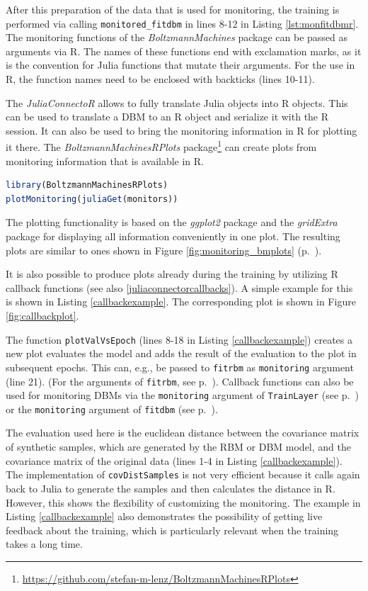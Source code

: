 \documentclass[12pt]{article}
\newcommand{\inlinecode}[1]{\texttt{#1}}
\newcommand{\apkg}[1]{\emph{#1}}
\begin{document}
After this preparation of the data that is used for monitoring, the training is performed via calling \inlinecode{monitored\_fitdbm} in lines 8-12 in Listing \ref{lst:monfitdbmr}.
The monitoring functions of the \apkg{BoltzmannMachines} package can be passed as arguments via R.
The names of these functions end with exclamation marks, as it is the convention for Julia functions that mutate their arguments.
For the use in R, the function names need to be enclosed with backticks (lines 10-11).

The \apkg{JuliaConnectoR} allows to fully translate Julia objects into R objects.
This can be used to translate a DBM to an R object and serialize it with the R session.
It can also be used to bring the monitoring information in R for plotting it there.
The \apkg{BoltzmannMachinesRPlots} package\footnote{\url{https://github.com/stefan-m-lenz/BoltzmannMachinesRPlots}} can create plots from monitoring information that is available in R.

\begin{lstlisting}[language=R, float = !h]
library(BoltzmannMachinesRPlots)
plotMonitoring(juliaGet(monitors))
\end{lstlisting}

The plotting functionality is based on the \apkg{ggplot2} package \citep{ggplot2}  and the \apkg{gridExtra} package \citep{gridExtra} for displaying all information conveniently in one plot.
The resulting plots are similar to ones shown in Figure \ref{fig:monitoring_bmplots} (p.~\pageref{fig:monitoring_bmplots}).

It is also possible to produce plots already during the training by utilizing R callback functions (see also \ref{juliaconnectorcallbacks}).
A simple example for this is shown in Listing \ref{callbackexample}.
The corresponding plot is shown in Figure \ref{fig:callbackplot}.

The function \inlinecode{plotValVsEpoch} (lines 8-18 in Listing \ref{callbackexample}) creates a new plot evaluates the model and adds the result of the evaluation to the plot in subsequent epochs.
This can, e.g., be passed to \inlinecode{fitrbm} as \inlinecode{monitoring} argument (line 21). (For the arguments of \inlinecode{fitrbm}, see p.~\pageref{bms_fitrbm}).
Callback functions can also be used for monitoring DBMs via the \inlinecode{monitoring} argument of \inlinecode{TrainLayer} (see p.~\pageref{bms_TrainLayer}) or the \inlinecode{monitoring} argument of \inlinecode{fitdbm} (see p.~\pageref{bms_fitdbm}).

The evaluation used here is the euclidean distance between the covariance matrix of synthetic samples, which are generated by the RBM or DBM model, and the covariance matrix of the original data (lines 1-4 in Listing \ref{callbackexample}).
The implementation of \inlinecode{covDistSamples} is not very efficient because it calls again back to Julia to generate the samples and then calculates the distance in R.
However, this shows the flexibility of customizing the monitoring.
The example in Listing \ref{callbackexample} also demonstrates the possibility of getting live feedback about the training, which is particularly relevant when the training takes a long time.
\end{document}
